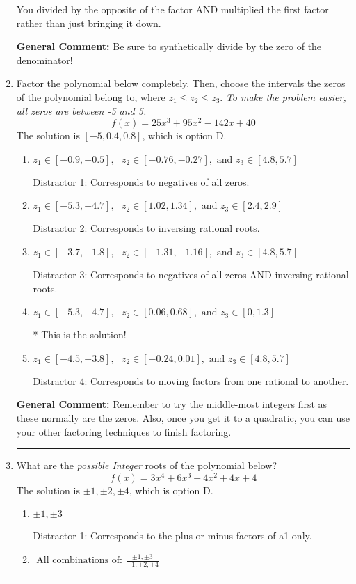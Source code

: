 \documentclass{extbook}[14pt]
\newcommand{\litem}[1]{\item #1

\rule{\textwidth}{0.4pt}}
\begin{document}
\begin{enumerate}
{\begin{enumerate}[label=\Alph*.]
 You divided by the opposite of the factor AND multiplied the first factor rather than just bringing it down.
\end{enumerate}

\textbf{General Comment:} Be sure to synthetically divide by the zero of the denominator!
}
\litem{
Factor the polynomial below completely. Then, choose the intervals the zeros of the polynomial belong to, where $z_1 \leq z_2 \leq z_3$. \textit{To make the problem easier, all zeros are between -5 and 5.}
\[ f(x) = 25x^{3} +95 x^{2} -142 x + 40 \]The solution is \( [-5, 0.4, 0.8] \), which is option D.\begin{enumerate}[label=\Alph*.]
\item \( z_1 \in [-0.9, -0.5], \text{   }  z_2 \in [-0.76, -0.27], \text{   and   } z_3 \in [4.8, 5.7] \)

 Distractor 1: Corresponds to negatives of all zeros.
\item \( z_1 \in [-5.3, -4.7], \text{   }  z_2 \in [1.02, 1.34], \text{   and   } z_3 \in [2.4, 2.9] \)

 Distractor 2: Corresponds to inversing rational roots.
\item \( z_1 \in [-3.7, -1.8], \text{   }  z_2 \in [-1.31, -1.16], \text{   and   } z_3 \in [4.8, 5.7] \)

 Distractor 3: Corresponds to negatives of all zeros AND inversing rational roots.
\item \( z_1 \in [-5.3, -4.7], \text{   }  z_2 \in [0.06, 0.68], \text{   and   } z_3 \in [0, 1.3] \)

* This is the solution!
\item \( z_1 \in [-4.5, -3.8], \text{   }  z_2 \in [-0.24, 0.01], \text{   and   } z_3 \in [4.8, 5.7] \)

 Distractor 4: Corresponds to moving factors from one rational to another.
\end{enumerate}

\textbf{General Comment:} Remember to try the middle-most integers first as these normally are the zeros. Also, once you get it to a quadratic, you can use your other factoring techniques to finish factoring.
}
\litem{
What are the \textit{possible Integer} roots of the polynomial below?
\[ f(x) = 3x^{4} +6 x^{3} +4 x^{2} +4 x + 4 \]The solution is \( \pm 1,\pm 2,\pm 4 \), which is option D.\begin{enumerate}[label=\Alph*.]
\item \( \pm 1,\pm 3 \)

 Distractor 1: Corresponds to the plus or minus factors of a1 only.
\item \( \text{ All combinations of: }\frac{\pm 1,\pm 3}{\pm 1,\pm 2,\pm 4} \)


\end{enumerate}}
\end{enumerate}
\end{document}
